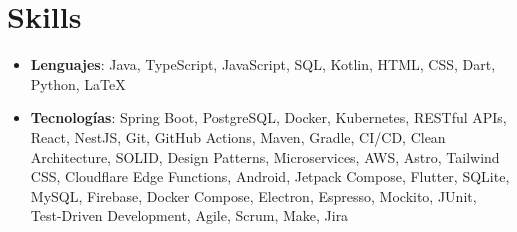 \documentclass[letterpaper,11pt]{article}
\newcommand{\resumeSubHeadingListStart}{\begin{itemize}[leftmargin=*]}
\newcommand{\resumeSubHeadingListEnd}{\end{itemize}}
\begin{document}
\section{Skills}
\resumeSubHeadingListStart
\item{
            \textbf{Lenguajes}{: Java, TypeScript, JavaScript, SQL, Kotlin, HTML, CSS, Dart, Python, LaTeX}

      }
\item {
            \textbf{Tecnologías}{: Spring Boot, PostgreSQL, Docker, Kubernetes, RESTful APIs, React, NestJS, Git, GitHub Actions, Maven, Gradle, CI/CD, Clean Architecture, SOLID, Design Patterns, Microservices, AWS, Astro, Tailwind CSS, Cloudflare Edge Functions, Android, Jetpack Compose, Flutter, SQLite, MySQL, Firebase, Docker Compose, Electron, Espresso, Mockito, JUnit, Test-Driven Development, Agile, Scrum, Make, Jira}
      }
\resumeSubHeadingListEnd


\end{document}
